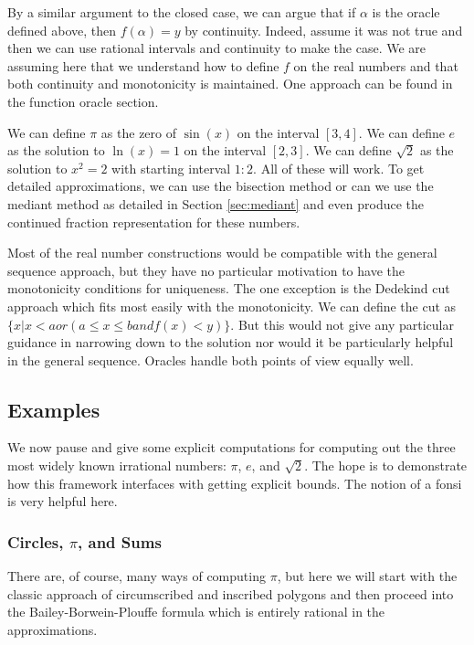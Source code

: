 \documentclass[12pt]{article}
\theoremstyle{remark}
\begin{document}
By a similar argument to the closed case, we can argue that if $\alpha$ is the oracle defined above, then $f(\alpha)=y$ by continuity. Indeed, assume it was not true and then we can use rational intervals and continuity to make the case. We are assuming here that we understand how to define $f$ on the real numbers and that both continuity and monotonicity is maintained. One approach can be found in the function oracle section. 

We can define $\pi$ as the zero of $\sin(x)$ on the interval $[3,4]$. We can define $e$ as the solution to  $\ln(x)=1$ on the interval $[2,3]$. We can define $\sqrt{2}$ as the solution to $x^2 = 2$ with starting interval $1:2$. All of these will work. To get detailed approximations, we can use the bisection method or can we use the mediant method as detailed in Section \ref{sec:mediant} and even produce the continued fraction representation for these numbers.
 
Most of the real number constructions would be compatible with the general sequence approach, but they have no particular motivation to have the monotonicity conditions for uniqueness. The one exception is the Dedekind cut approach which fits most easily with the monotonicity. We can define the cut as $\{x| x<a or (a \leq x \leq b and f(x) < y) \}$. But this would not give any particular guidance in narrowing down to the solution nor would it be particularly helpful in the general sequence. Oracles handle both points of view equally well. 



\subsection{Examples}


We now pause and give some explicit computations for computing out the three most widely known irrational numbers: $\pi$, $e$, and $\sqrt{2}$. The hope is to demonstrate how this framework interfaces with getting explicit bounds. The notion of a fonsi is very helpful here. 

\subsubsection{Circles, $\pi$, and Sums}

There are, of course, many ways of computing $\pi$, but here we will start with the classic approach of circumscribed and inscribed polygons and then proceed into the Bailey-Borwein-Plouffe formula which is entirely rational in the approximations. 
\end{document}
